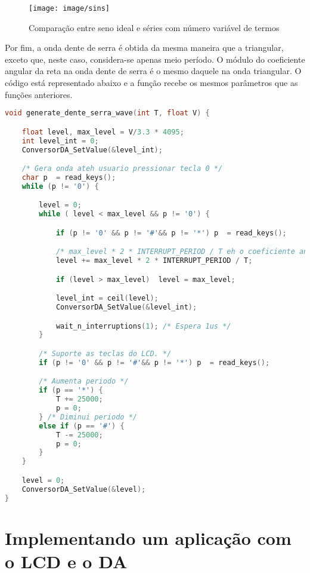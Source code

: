 \begin{figure}[h]
    \centering
    \texttt{[image: image/sins]}
    \caption{Comparação entre seno ideal e séries com número variável de termos}
    \label{img:sins}
\end{figure} 

\FloatBarrier

Por fim, a onda dente de serra é obtida da mesma maneira que a triangular,
exceto que, neste caso, considera-se apenas meio período. O módulo do
coeficiente angular da reta na onda dente de serra é o mesmo daquele na onda
triangular. O código está representado abaixo e a função recebe os mesmos
parâmetros que as funções anteriores.

\begin{lstlisting}[caption= Função de geração de ondas dente de serra.
,language=C, numbers=none] 
void generate_dente_serra_wave(int T, float V) {

	float level, max_level = V/3.3 * 4095;
	int level_int = 0;
	ConversorDA_SetValue(&level_int);

	/* Gera onda ateh usuario pressionar tecla 0 */
	char p  = read_keys();
	while (p != '0') {

		level = 0;
		while ( level < max_level && p != '0') {

			if (p != '0' && p != '#'&& p != '*') p  = read_keys();

			/* max_level * 2 * INTERRUPT_PERIOD / T eh o coeficiente angular */
			level += max_level * 2 * INTERRUPT_PERIOD / T;

			if (level > max_level)	level = max_level;

			level_int = ceil(level);
			ConversorDA_SetValue(&level_int);

			wait_n_interruptions(1); /* Espera 1us */
		}

		/* Suporte as teclas do LCD. */
		if (p != '0' && p != '#'&& p != '*') p  = read_keys();

		/* Aumenta periodo */
		if (p == '*') {
			T += 25000;
			p = 0;
		} /* Diminui periodo */
		else if (p == '#') {
			T -= 25000;
			p = 0;
		}
	}

	level = 0;
	ConversorDA_SetValue(&level);
}
\end{lstlisting}

\section {Implementando um aplicação com o LCD e o DA}

